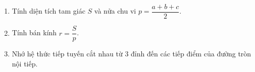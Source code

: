 \begin{enumerate}
\item Tính diện tích tam giác $S$ và nửa chu vi $p = \dfrac{a+b+c}{2}$.
\item Tính bán kính $r = \dfrac{S}{p}$.
\item Nhớ hệ thức tiếp tuyến cắt nhau từ $3$ đỉnh đến các tiếp điểm của đường tròn nội tiếp.
\end{enumerate}
